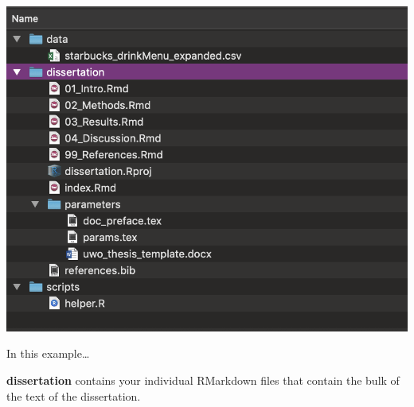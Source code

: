 \documentclass[
  12pt,
  oneside]{book}
\numberwithin{figure}{chapter}
\begin{document}
\includegraphics{images/dir_structure.png}

In this example\ldots{}

\textbf{dissertation} contains your individual RMarkdown files that contain the bulk of the text of the dissertation.
\end{document}
